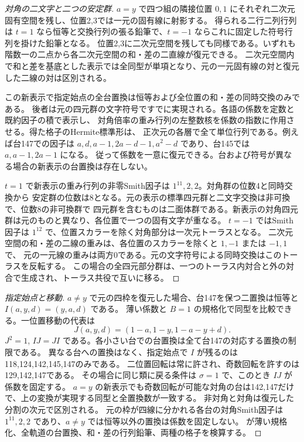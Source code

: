 \begin{proof}[対角の二文字と二つの安定群]
$a=y$ で四つ組の隣接位置 $0,1$ にそれぞれ二次元固有空間を残し、位置2,3では一元の固有線に射影する。
得られる二行二列行列は $t=1$ なら恒等と交換行列の張る鉛筆で、$t=-1$ ならこれに固定した符号行列を掛けた鉛筆となる。
位置2,3に二次元空間を残しても同様である。いずれも階数一の二点から各二次元空間の和・差の二直線が復元できる。
二次元空間内で和と差を基底とした表示では全同型が単項となり、元の一元固有線の対と復元した二線の対は区別される。

この新表示で指定始点の全台置換は恒等および全位置の和・差の同時交換のみである。
後者は元の四元群の文字符号ですでに実現される。各語の係数を定数と既約因子の積で表示し、
対角倍率の重み行列の左整数核を係数の指数に作用させる。得た格子のHermite標準形は、
正次元の各層で全て単位行列である。例えば台147での因子は
$a,d,a-1,2a-d-1,a^2-d$ であり、台145では $a,a-1,2a-1$ になる。
従って係数を一意に復元できる。台および符号が異なる場合の新表示の台置換は存在しない。

$t=1$ で新表示の重み行列の非零Smith因子は $1^{11},2,2$。対角群の位数4と同時交換から
安定群の位数は8となる。元の表示の標準四元群と二文字交換は非可換で、位数8の非可換群で
四元群を含むものは二面体群である。新表示の対角四元群は元のものと異なり、各位置で一つの固有文字が重なる。
$t=-1$ ではSmith因子は $1^{12}$ で、位置スカラーを除く対角部分は一次元トーラスとなる。
二次元空間の和・差の二線の重みは、各位置のスカラーを除くと $1,-1$ または $-1,1$ で、
元の一元線の重みは両方0である。元の文字符号による同時交換はこのトーラスを反転する。
この場合の全四元部分群は、一つのトーラス内対合と外の対合で生成され、トーラス共役で互いに移る。
\end{proof}

\begin{proof}[指定始点と移動]
$a\ne y$ で元の四枠を復元した場合、台147を保つ二置換は恒等と $I(a,y,d)=(y,a,d)$ である。
薄い係数と $B=1$ の規格化で同型を比較できる。一位置移動の代表は
\[
 J(a,y,d)=(1-a,1-y,1-a-y+d).
\]
$J^2=1$, $IJ=JI$ である。各小さい台での台置換は全て台147の対応する置換の制限である。
異なる台への置換はなく、指定始点で $I$ が残るのは118,124,142,145,147のみである。
二位置回転は常に許され、奇数回転を許すのは129,142,147である。
その場合に同じ類に戻る条件は $\sigma=1$ で、このとき $IJ$ が係数を固定する。
$a=y$ の新表示でも奇数回転が可能な対角の台は142,147だけで、上の変換が実現する同型と全置換数が一致する。
非対角と対角は復元した分割の次元で区別される。
元の枠が四線に分かれる各台の対角Smith因子は $1^{11},2,2$ であり、$a\ne y$ では恒等以外の置換は係数を固定しない。
 が薄い規格化、全軌道の台置換、和・差の行列鉛筆、両種の格子を検算する。
\end{proof}
